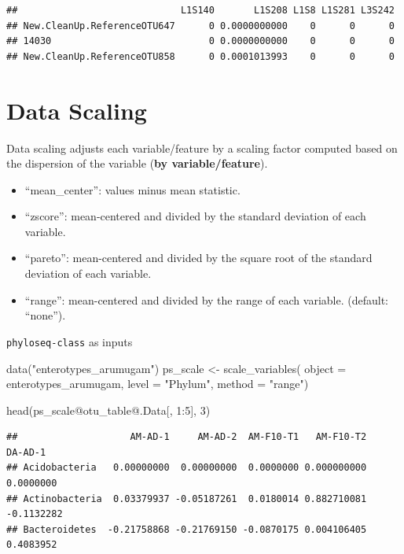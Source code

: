 \documentclass[
]{book}
\newenvironment{Shaded}{\begin{snugshade}}{\end{snugshade}}
\newcommand{\AttributeTok}[1]{\textcolor[rgb]{0.77,0.63,0.00}{#1}}
\newcommand{\DecValTok}[1]{\textcolor[rgb]{0.00,0.00,0.81}{#1}}
\newcommand{\FunctionTok}[1]{\textcolor[rgb]{0.00,0.00,0.00}{#1}}
\newcommand{\NormalTok}[1]{#1}
\newcommand{\OtherTok}[1]{\textcolor[rgb]{0.56,0.35,0.01}{#1}}
\newcommand{\SpecialCharTok}[1]{\textcolor[rgb]{0.00,0.00,0.00}{#1}}
\newcommand{\StringTok}[1]{\textcolor[rgb]{0.31,0.60,0.02}{#1}}
\begin{document}
\begin{verbatim}
##                             L1S140       L1S208 L1S8 L1S281 L3S242
## New.CleanUp.ReferenceOTU647      0 0.0000000000    0      0      0
## 14030                            0 0.0000000000    0      0      0
## New.CleanUp.ReferenceOTU858      0 0.0001013993    0      0      0
\end{verbatim}

\hypertarget{data-scaling}{%
\section{Data Scaling}\label{data-scaling}}

Data scaling adjusts each variable/feature by a scaling factor computed based on the dispersion of the variable (\textbf{by variable/feature}).

\begin{itemize}
\item
  ``mean\_center'': values minus mean statistic.
\item
  ``zscore'': mean-centered and divided by the standard deviation of each variable.
\item
  ``pareto'': mean-centered and divided by the square root of the standard deviation of each variable.
\item
  ``range'': mean-centered and divided by the range of each variable. (default: ``none'').
\end{itemize}

\texttt{phyloseq-class} as inputs

\begin{Shaded}
\begin{Highlighting}[]
\FunctionTok{data}\NormalTok{(}\StringTok{"enterotypes\_arumugam"}\NormalTok{)}
\NormalTok{ps\_scale }\OtherTok{\textless{}{-}} \FunctionTok{scale\_variables}\NormalTok{(}
  \AttributeTok{object =}\NormalTok{ enterotypes\_arumugam,}
  \AttributeTok{level =} \StringTok{"Phylum"}\NormalTok{,}
  \AttributeTok{method =} \StringTok{"range"}\NormalTok{)}

\FunctionTok{head}\NormalTok{(ps\_scale}\SpecialCharTok{@}\NormalTok{otu\_table}\SpecialCharTok{@}\NormalTok{.Data[, }\DecValTok{1}\SpecialCharTok{:}\DecValTok{5}\NormalTok{], }\DecValTok{3}\NormalTok{)}
\end{Highlighting}
\end{Shaded}

\begin{verbatim}
##                    AM-AD-1     AM-AD-2  AM-F10-T1   AM-F10-T2    DA-AD-1
## Acidobacteria   0.00000000  0.00000000  0.0000000 0.000000000  0.0000000
## Actinobacteria  0.03379937 -0.05187261  0.0180014 0.882710081 -0.1132282
## Bacteroidetes  -0.21758868 -0.21769150 -0.0870175 0.004106405  0.4083952
\end{verbatim}
\end{document}
